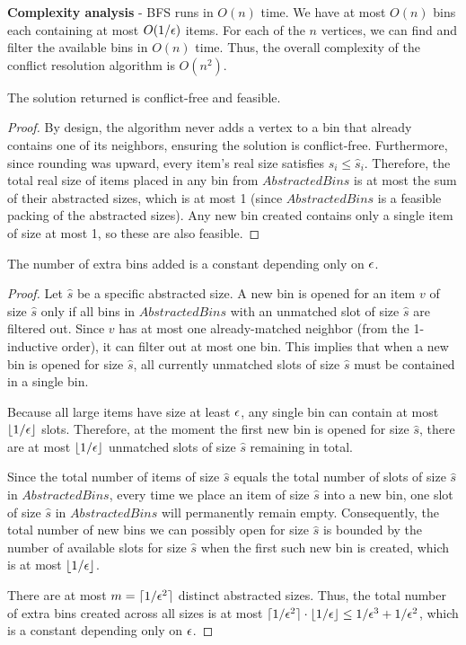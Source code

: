 \textbf{Complexity analysis} - BFS runs in $O(n)$ time. We have at most $O(n)$ bins each containing at most $O(1/\epsilon)$ items. For each of the $n$ vertices, we can find and filter the available bins in $O(n)$ time. Thus, the overall complexity of the conflict resolution algorithm is $O(n^2)$.

\begin{claim}
The solution returned is conflict-free and feasible.
\end{claim}

\begin{proof}
By design, the algorithm never adds a vertex to a bin that already contains one of its neighbors, ensuring the solution is conflict-free. Furthermore, since rounding was upward, every item's real size satisfies $s_i \leq \hat{s}_i$. Therefore, the total real size of items placed in any bin from $AbstractedBins$ is at most the sum of their abstracted sizes, which is at most 1 (since $AbstractedBins$ is a feasible packing of the abstracted sizes). Any new bin created contains only a single item of size at most 1, so these are also feasible.
\end{proof}

\begin{claim}
The number of extra bins added is a constant depending only on $\epsilon$.
\end{claim}

\begin{proof}
Let $\hat{s}$ be a specific abstracted size. A new bin is opened for an item $v$ of size $\hat{s}$ only if all bins in $AbstractedBins$ with an unmatched slot of size $\hat{s}$ are filtered out. Since $v$ has at most one already-matched neighbor (from the 1-inductive order), it can filter out at most one bin. This implies that when a new bin is opened for size $\hat{s}$, all currently unmatched slots of size $\hat{s}$ must be contained in a single bin.

Because all large items have size at least $\epsilon$, any single bin can contain at most $\lfloor 1/\epsilon \rfloor$ slots. Therefore, at the moment the first new bin is opened for size $\hat{s}$, there are at most $\lfloor 1/\epsilon \rfloor$ unmatched slots of size $\hat{s}$ remaining in total.

Since the total number of items of size $\hat{s}$ equals the total number of slots of size $\hat{s}$ in $AbstractedBins$, every time we place an item of size $\hat{s}$ into a new bin, one slot of size $\hat{s}$ in $AbstractedBins$ will permanently remain empty. Consequently, the total number of new bins we can possibly open for size $\hat{s}$ is bounded by the number of available slots for size $\hat{s}$ when the first such new bin is created, which is at most $\lfloor 1/\epsilon \rfloor$.

There are at most $m = \lceil 1/\epsilon^2 \rceil$ distinct abstracted sizes. Thus, the total number of extra bins created across all sizes is at most $\lceil 1/\epsilon^2 \rceil \cdot \lfloor 1/\epsilon \rfloor \leq 1/\epsilon^3 + 1/\epsilon^2$, which is a constant depending only on $\epsilon$.
\end{proof}



